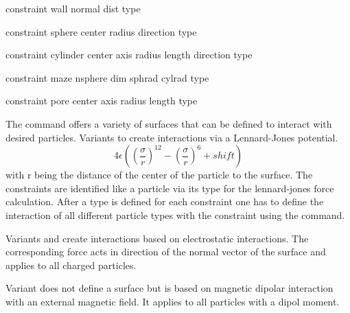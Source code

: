 \begin{essyntax}
  
  constraint wall normal    
  dist  type 

  constraint sphere center    
  radius  direction  type  
  
  constraint cylinder center    
  axis    
  radius  length  
  direction  
  type  

  constraint maze nsphere  
  dim  sphrad  cylrad 
  type 

  constraint pore center    
  axis    
  radius  length  
  type  

  
  
\end{essyntax}

The  command offers a variety of surfaces that can be
defined to interact with desired particles. Variants  to 
create interactions via a
Lennard-Jones potential. \[4 \epsilon \left(\left(\frac{\sigma}{r}\right)^{12} -
  \left(\frac{\sigma}{r}\right)^6 + shift\right)\] with r being the
distance of the center of the particle to the surface. The constraints are identified like a particle via its
type for the lennard-jones force calculation. 
After a type is defined for each constraint one has
to define
the interaction of all different particle types with the constraint using
the  command.

Variants  and  create interactions based on electrostatic
interactions. The corresponding force acts in direction of the normal vector of the
surface and applies to all charged particles.

Variant  does not define a surface but is based on magnetic
dipolar interaction with an external magnetic field. It applies to all particles
with a dipol moment.

